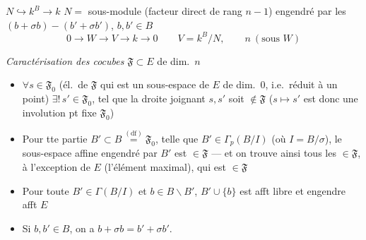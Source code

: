 \documentclass[11pt,a4paper]{article}
\begin{document}
\struck{\ill{}} $N \hookrightarrow k^B \longrightarrow k$ \qquad $N = $ sous-module (facteur direct de rang $n-1$) engendré par les $(b + \sigma b) - (b' + \sigma b')$, $b, b' \in B$
\[
0 \to W \longrightarrow V \longrightarrow k \to 0 \qquad V = k^B/N, \qquad n\ (\text{sous } W)
\]

\emph{Caractérisation des cocubes} \quad $\mathfrak{F} \subset E$  de dim.\ $n$
\begin{itemize}
  \item[a)] $\forall s \in \mathfrak{F}_0$ (él.\ de $\mathfrak{F}$ qui est un sous-espace de $E$ de dim.\ 0, i.e.\ réduit à un point) $\exists!\, s' \in \mathfrak{F}_0$,  tel que la droite joignant $s, s'$ soit $\notin \mathfrak{F}$
  ($s \mapsto s'$ est donc une involution  pt fixe  $\mathfrak{F}_0$)
  \item[b)] Pour tte partie $B' \subset B \overset{(\text{df})}{=} \mathfrak{F}_0$, telle que $B' \in \Gamma_p(B/I)$ (où $I = B/\sigma$), le sous-espace  affine engendré par $B'$  est $\in \mathfrak{F}$ — et on trouve ainsi tous les $\in \mathfrak{F}$,  à l'exception de $E$ (l'élément maximal), qui est $\in \mathfrak{F}$
  \item[c)] Pour toute $B' \in \Gamma(B/I)$ et $b \in B \smallsetminus B'$, $B' \cup \{b\}$ est afft libre et engendre afft $E$
  \item[d)] Si $b, b' \in B$, on a $b + \sigma b = b' + \sigma b'$.
\end{itemize}
\end{document}
